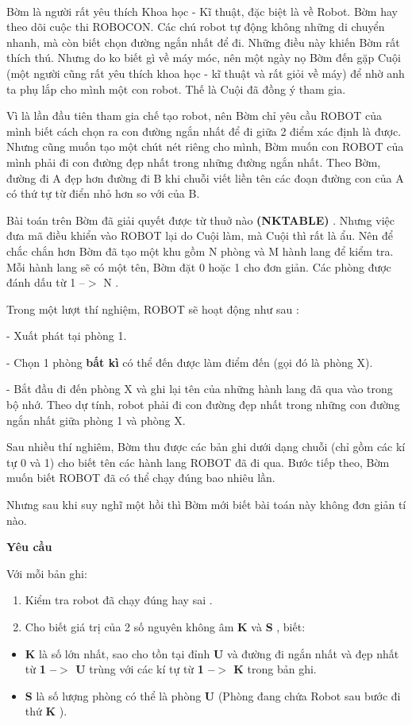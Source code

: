  

Bờm là người rất yêu thích Khoa học - Kĩ thuật, đặc biệt là về Robot. Bờm hay theo dõi cuộc thi ROBOCON. Các chú robot tự động không những di chuyển nhanh, mà còn biết chọn đường ngắn nhất để đi. Những điều này khiến Bờm rất thích thú. Nhưng do ko biết gì về máy móc, nên một ngày nọ Bờm đến gặp Cuội (một người cũng rất yêu thích khoa học - kĩ thuật và rất giỏi về máy) để nhờ anh ta phụ lắp cho mình một con robot. Thế là Cuội đã đồng ý tham gia.

Vì là lần đầu tiên tham gia chế tạo robot, nên Bờm chỉ yêu cầu ROBOT của mình biết cách chọn ra con đường ngắn nhất để đi giữa 2 điểm xác định là được. Nhưng cũng muốn tạo một chút nét riêng cho mình, Bờm muốn con ROBOT của mình phải đi con đường đẹp nhất trong những đường ngắn nhất. Theo Bờm, đường đi A đẹp hơn đường đi B khi chuỗi viết liền tên các đoạn đường con của A có thứ tự từ điển nhỏ hơn so với của B.

Bài toán trên Bờm đã giải quyết được từ thuở nào \textbf{ (NKTABLE) } . Nhưng việc đưa mã điều khiển vào ROBOT lại do Cuội làm, mà Cuội thì rất là ẩu. Nên để chắc chắn hơn Bờm đã tạo một khu gồm N phòng và M hành lang để kiểm tra. Mỗi hành lang sẽ có một tên, Bờm đặt 0 hoặc 1 cho đơn giản. Các phòng được đánh dấu từ 1 --$>$ N .

Trong một lượt thí nghiệm, ROBOT sẽ hoạt động như sau :

- Xuất phát tại phòng 1.

- Chọn 1 phòng \textbf{ bất kì }có thể đến được làm điểm đến (gọi đó là phòng X).

- Bắt đầu đi đến phòng X và ghi lại tên của những hành lang đã qua vào trong bộ nhớ. Theo dự tính, robot phải đi con đường đẹp nhất trong những con đường ngắn nhất giữa phòng 1 và phòng X.

Sau nhiều thí nghiêm, Bờm thu được các bản ghi dưới dạng chuỗi (chỉ gồm các kí tự 0 và 1) cho biết tên các hành lang ROBOT đã đi qua. Bước tiếp theo, Bờm muốn biết ROBOT đã có thể chạy đúng bao nhiêu lần.

Nhưng sau khi suy nghĩ một hồi thì Bờm mới biết bài toán này không đơn giản tí nào.

\textbf{Yêu cầu
}

Với mỗi bản ghi:
\begin{enumerate}
	\item Kiểm tra robot đã chạy đúng hay sai .
	\item Cho biết giá trị của 2 số nguyên không âm \textbf{ K } và \textbf{ S } , biết:
\end{enumerate}
\begin{enumerate}
\end{enumerate}
\begin{itemize}
	\item \textbf{K } là số lớn nhất, sao cho tồn tại đỉnh \textbf{ U } và đường đi ngắn nhất và đẹp nhất từ \textbf{ 1 --$>$ U } trùng với các kí tự từ \textbf{ 1 --$>$ K } trong bản ghi.
	\item \textbf{S } là số lượng phòng có thể là phòng \textbf{ U } (Phòng đang chứa Robot sau bước đi thứ \textbf{ K } ).
\end{itemize}